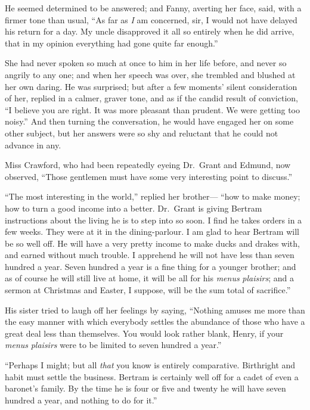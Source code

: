 He seemed determined to be answered; and Fanny,
averting her face, said, with a firmer tone than usual,
``As far as \emph{I} am concerned, sir, I would not have
delayed his return for a day.  My uncle disapproved it
all so entirely when he did arrive, that in my opinion
everything had gone quite far enough.''

She had never spoken so much at once to him in her life before,
and never so angrily to any one; and when her speech was over,
she trembled and blushed at her own daring.  He was surprised;
but after a few moments' silent consideration of her,
replied in a calmer, graver tone, and as if the candid
result of conviction, ``I believe you are right.  It was
more pleasant than prudent.  We were getting too noisy.''
And then turning the conversation, he would have engaged
her on some other subject, but her answers were so shy
and reluctant that he could not advance in any.

Miss Crawford, who had been repeatedly eyeing Dr.\ Grant
and Edmund, now observed, ``Those gentlemen must have
some very interesting point to discuss.''

``The most interesting in the world,'' replied her brother---%
``how to make money; how to turn a good income into a better.
Dr.\ Grant is giving Bertram instructions about the living
he is to step into so soon.  I find he takes orders
in a few weeks.  They were at it in the dining-parlour.
I am glad to hear Bertram will be so well off.  He will
have a very pretty income to make ducks and drakes with,
and earned without much trouble.  I apprehend he will
not have less than seven hundred a year.  Seven hundred
a year is a fine thing for a younger brother; and as of
course he will still live at home, it will be all for his
\emph{menus} \emph{plaisirs}; and a sermon at Christmas and Easter,
I suppose, will be the sum total of sacrifice.''

His sister tried to laugh off her feelings by saying,
``Nothing amuses me more than the easy manner with which everybody
settles the abundance of those who have a great deal less
than themselves.  You would look rather blank, Henry, if your
\emph{menus} \emph{plaisirs} were to be limited to seven hundred a year.''

``Perhaps I might; but all \emph{that} you know is
entirely comparative.  Birthright and habit must settle
the business.  Bertram is certainly well off for a cadet
of even a baronet's family.  By the time he is four or five
and twenty he will have seven hundred a year, and nothing to do for
it.''

